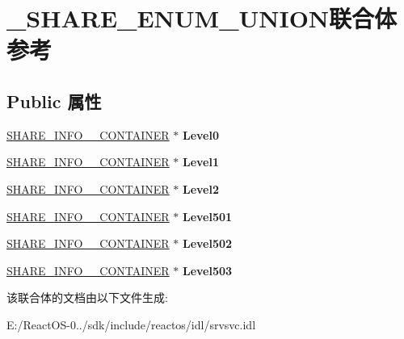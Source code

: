\hypertarget{union___s_h_a_r_e___e_n_u_m___u_n_i_o_n}{}\section{\+\_\+\+S\+H\+A\+R\+E\+\_\+\+E\+N\+U\+M\+\_\+\+U\+N\+I\+O\+N联合体 参考}
\label{union___s_h_a_r_e___e_n_u_m___u_n_i_o_n}
\subsection*{Public 属性}
\begin{DoxyCompactItemize}
\item 
\mbox{\label{union___s_h_a_r_e___e_n_u_m___u_n_i_o_n_ad8715d59180908e1e8778f0c797e44d0}} 
\hyperlink{struct___s_h_a_r_e___i_n_f_o__0___c_o_n_t_a_i_n_e_r}{S\+H\+A\+R\+E\+\_\+\+I\+N\+F\+O\+\_\+\_\+\+C\+O\+N\+T\+A\+I\+N\+ER} $\ast$ {\bfseries Level0}
\item 
\mbox{\label{union___s_h_a_r_e___e_n_u_m___u_n_i_o_n_a356d4698e3206f64691d50a5f31911d5}} 
\hyperlink{struct___s_h_a_r_e___i_n_f_o__1___c_o_n_t_a_i_n_e_r}{S\+H\+A\+R\+E\+\_\+\+I\+N\+F\+O\+\_\+\_\+\+C\+O\+N\+T\+A\+I\+N\+ER} $\ast$ {\bfseries Level1}
\item 
\mbox{\label{union___s_h_a_r_e___e_n_u_m___u_n_i_o_n_ab5f02da4849228860ce0fc711fa996c3}} 
\hyperlink{struct___s_h_a_r_e___i_n_f_o__2___c_o_n_t_a_i_n_e_r}{S\+H\+A\+R\+E\+\_\+\+I\+N\+F\+O\+\_\+\_\+\+C\+O\+N\+T\+A\+I\+N\+ER} $\ast$ {\bfseries Level2}
\item 
\mbox{\label{union___s_h_a_r_e___e_n_u_m___u_n_i_o_n_af4ce52e2ed55c2b7c22e2dcfbf1c7d7d}} 
\hyperlink{struct___s_h_a_r_e___i_n_f_o__501___c_o_n_t_a_i_n_e_r}{S\+H\+A\+R\+E\+\_\+\+I\+N\+F\+O\+\_\+\_\+\+C\+O\+N\+T\+A\+I\+N\+ER} $\ast$ {\bfseries Level501}
\item 
\mbox{\label{union___s_h_a_r_e___e_n_u_m___u_n_i_o_n_a8100a4b9eb1b746c15d0bd7d5b8d6380}} 
\hyperlink{struct___s_h_a_r_e___i_n_f_o__502___c_o_n_t_a_i_n_e_r}{S\+H\+A\+R\+E\+\_\+\+I\+N\+F\+O\+\_\+\_\+\+C\+O\+N\+T\+A\+I\+N\+ER} $\ast$ {\bfseries Level502}
\item 
\mbox{\label{union___s_h_a_r_e___e_n_u_m___u_n_i_o_n_ae87abc7c5510a4ff522d57a68c9e98dc}} 
\hyperlink{struct___s_h_a_r_e___i_n_f_o__503___c_o_n_t_a_i_n_e_r}{S\+H\+A\+R\+E\+\_\+\+I\+N\+F\+O\+\_\+\_\+\+C\+O\+N\+T\+A\+I\+N\+ER} $\ast$ {\bfseries Level503}
\end{DoxyCompactItemize}


该联合体的文档由以下文件生成\+:\begin{DoxyCompactItemize}
\item 
E\+:/\+React\+O\+S-\/0../sdk/include/reactos/idl/srvsvc.\+idl\end{DoxyCompactItemize}
